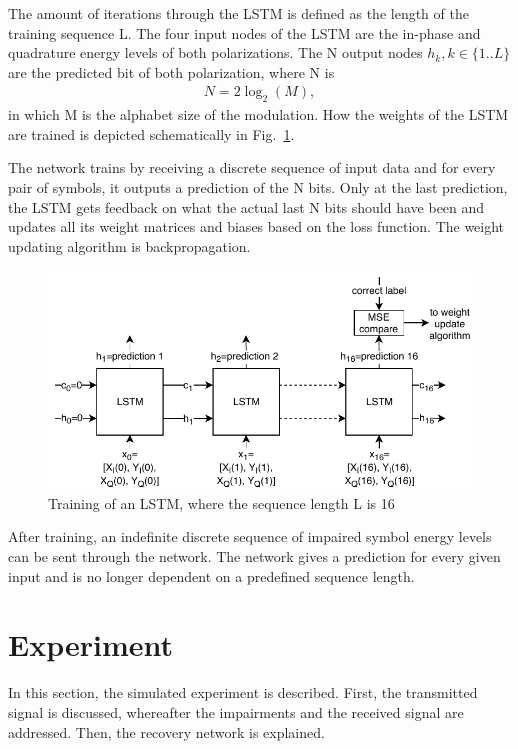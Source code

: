 \documentclass[journal,10pt,twoside, a4paper]{IEEEtran}
\begin{document}
The amount of iterations through the LSTM is defined as the length of the training sequence L. The four input nodes of the LSTM are the in-phase and quadrature energy levels of both polarizations. The N output nodes $h_k, k\in\{1..L\}$ are the predicted bit of both polarization, where N is
\begin{align}
    N = 2\log_2(M),
\end{align}
in which M is the alphabet size of the modulation. How the weights of the LSTM are trained is depicted schematically in Fig.~\ref{fig:lstm_training}.

The network trains by receiving a discrete sequence of input data and for every pair of symbols, it outputs a prediction of the N bits. Only at the last prediction, the LSTM gets feedback on what the actual last N bits should have been and updates all its weight matrices and biases based on the loss function. The weight updating algorithm is backpropagation. 

\begin{figure}
    \centering
    \includegraphics[width=\linewidth]{Thesis/images/lstm_training.pdf}
    \caption{Training of an LSTM, where the sequence length L is 16}
    \label{fig:lstm_training}
\end{figure}

After training, an indefinite discrete sequence of impaired symbol energy levels can be sent through the network. The network gives a prediction for every given input and is no longer dependent on a predefined sequence length.

\section{Experiment}
In this section, the simulated experiment is described. First, the transmitted signal is discussed, whereafter the impairments and the received signal are addressed. Then, the recovery network is explained.
\end{document}
